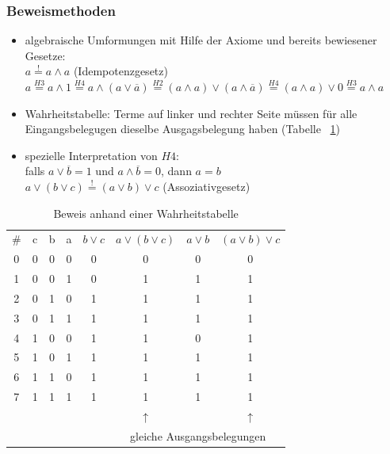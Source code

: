 \documentclass[10pt,a4paper]{scrartcl}
\newcommand{\reftbl}[1]{Tabelle ~\ref{#1}}
\begin{document}
\subsubsection{Beweismethoden}
\begin{itemize}
	\item algebraische Umformungen mit Hilfe der Axiome und bereits bewiesener Gesetze: \\
	$ a \overset{!}{=} a \wedge a $ (Idempotenzgesetz)\\
	$ a \overset{H3}{=} a \wedge 1 \overset{H4}{=} a \wedge ( a \vee \overline{a} ) \overset{H2}{=} (a \wedge a) \vee (a \wedge \overline{a}) \overset{H4}{=} (a \wedge a) \vee 0 \overset{H3}{=} a \wedge a$
	\item Wahrheitstabelle: Terme auf linker und rechter Seite müssen für alle Eingangsbelegugen dieselbe Ausgagsbelegung haben (\reftbl{tab:beweiswahrheitstabelle})
	\item spezielle Interpretation von $H4$:\\
	falls $ a \vee \overline{b} = 1 $ und $ a \wedge \overline{b} = 0 $, dann $ a = b $\\
	$ a \vee (b \vee c) \overset{!}{=} (a \vee b) \vee c $ (Assoziativgesetz)
\end{itemize}

\begin{table}
	\centering
	\begin{tabular}{c|ccc|c|c|c|c}
	\# & c & b & a & $ b \vee c $ & $ a \vee (b \vee c) $ & $ a \vee b $ & $ (a \vee b) \vee c$\\
	0 & 0 & 0 & 0 & 0 & 0 & 0 & 0\\
	1 & 0 & 0 & 1 & 0 & 1 & 1 & 1\\
	2 & 0 & 1 & 0 & 1 & 1 & 1 & 1\\
	3 & 0 & 1 & 1 & 1 & 1 & 1 & 1\\
	4 & 1 & 0 & 0 & 1 & 1 & 0 & 1\\
	5 & 1 & 0 & 1 & 1 & 1 & 1 & 1\\
	6 & 1 & 1 & 0 & 1 & 1 & 1 & 1\\
	7 & 1 & 1 & 1 & 1 & 1 & 1 & 1\\
	 \multicolumn{5}{c}{}& \multicolumn{1}{c}{$\uparrow$}&\multicolumn{1}{c}{}& $\uparrow$\\
	 \multicolumn{5}{c}{}&\multicolumn{3}{c}{gleiche Ausgangsbelegungen}
\end{tabular}
\label{tab:beweiswahrheitstabelle}
\caption{Beweis anhand einer Wahrheitstabelle}
\end{table}
\end{document}
